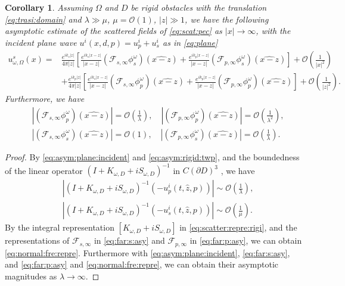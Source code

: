 \documentclass[a4paper,11pt]{article}
\newcommand{\mO}{\mathcal{O}}
\newtheorem{corollary}{Corollary}[section]
\theoremstyle{remark}
\theoremstyle{definition}
\numberwithin{equation}{section}
\begin{document}
\begin{corollary}\label{cor:near:shape:rigid:dete}
Assuming $\Omega$ and $D$ be rigid obstacles with the translation \eqref{eq:trasi:domain} and $\lambda  \gg \mu$, $ \mu = \mO(1)$, $|z| \gg 1$, we
have the following asymptotic estimate of the scattered fields of \eqref{eq:scat:pec} as $|x| \rightarrow \infty$, with the incident plane wave $u^{i}(x,d,p)=u_{p}^i + u_{s}^i$ as in \eqref{eq:plane}
\begin{subequations}  \label{eq:normal:fre:repre}
\begin{align}
 u_{\omega,\Omega}^s(x) =& \frac{e^{ik_s|z|}}{4 \pi |z|} \left[ \frac{e^{ik_s|x-z|}}{|x-z|} (\mathcal{F}_{s,\infty}\phi_{s}^\omega)(\widehat{x-z})   + \frac{e^{ik_p|x-z|}}{|x-z|}
(\mathcal{F}_{p,\infty}\phi_{s}^\omega)(\widehat{x-z}) \right] + \mathcal{O}(\frac{1}{|x|^2}) \\
   &+\frac{e^{ik_p|z|}}{4 \pi |z|} \left[ \frac{e^{ik_s|x-z|}}{|x-z|}  (\mathcal{F}_{s,\infty}\phi_{p}^\omega)(\widehat{x-z}) + \frac{e^{ik_p|x-z|}}{|x-z|} (\mathcal{F}_{p,\infty}\phi_{p}^\omega)(\widehat{x-z})\right] + \mO(\frac{1}{|z|^2}).
\end{align}
\end{subequations}
Furthermore,  we have
\begin{align*}
&|(\mathcal{F}_{s,\infty}\phi_{p}^\omega)(\widehat{x-z})| = \mO(\frac{1}{\lambda}), \quad |(\mathcal{F}_{p,\infty}\phi_{p}^\omega)(\widehat{x-z})| = \mO(\frac{1}{\lambda^2}), \\
&|(\mathcal{F}_{s,\infty}\phi_{s}^\omega)(\widehat{x-z})| = \mO(1), \quad  |(\mathcal{F}_{p,\infty}\phi_{s}^\omega)(\widehat{x-z})| = \mO(\frac{1}{\lambda}).
\end{align*}
\end{corollary}
\begin{proof}
By \eqref{eq:asym:plane:incident} and \eqref{eq:asym:rigid:twp}, and the boundedness of the linear operator $(I + K_{\omega,D} + i S_{\omega,D})^{-1}$ in $C(\partial D)^3$ \cite{KK, PH}, we have
\begin{align}
&|  (I + K_{\omega,D} + i S_{\omega,D})^{-1}(- u_{p}^{i}(t,\hat{z},p))| \sim \mO(\frac{1}{\lambda}), \\
&|  (I + K_{\omega,D} + i S_{\omega,D})^{-1}(- u_{s}^{i}(t,\hat{z},p))| \sim \mO(\frac{1}{\mu}). \label{eq:asym:normal:fre}
\end{align}
By the integral representation $[K_{\omega,D} + iS_{\omega,D}]$ in \eqref{eq:scatter:repre:rigi}, and the representations of
$\mathcal{F}_{s,\infty}$ in \eqref{eq:far:s:asy} and $\mathcal{F}_{p,\infty}$ in \eqref{eq:far:p:asy}, we can obtain \eqref{eq:normal:fre:repre}. Furthermore with \eqref{eq:asym:plane:incident}, \eqref{eq:far:s:asy}, and \eqref{eq:far:p:asy} and \eqref{eq:normal:fre:repre}, we can obtain their asymptotic magnitudes as $\lambda \rightarrow \infty$.
\end{proof}
\end{document}
